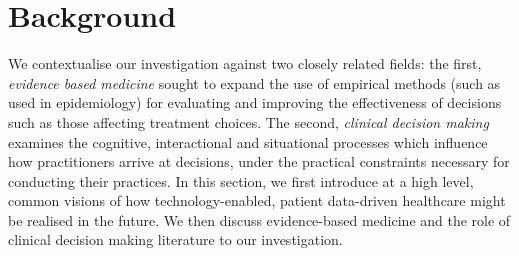 \documentclass{sigchi}
\begin{document}





\section{Background} 

We contextualise our investigation against two closely related fields: the first, \emph{evidence based medicine} sought to expand the use of empirical methods (such as used in epidemiology) for evaluating and improving the effectiveness of decisions such as those affecting treatment choices.  The second, \emph{clinical decision making} examines the cognitive, interactional and situational processes which influence how practitioners arrive at decisions, under the practical constraints necessary for conducting their practices.  In this section, we first introduce at a high level, common visions of how technology-enabled, patient data-driven healthcare might be realised in the future.  We then discuss evidence-based medicine and the role of clinical decision making literature to our investigation.
\end{document}
